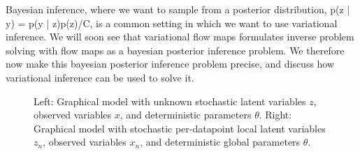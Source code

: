 \documentclass[12pt,a4paper]{report}
\begin{document}
Bayesian inference, where we want to sample from a posterior distribution, p(z | y) = p(y | z)p(z)/C, is a common setting in which we want to use variational inference. 
We will soon see that variational flow maps formulates inverse problem solving with flow maps as a bayesian posterior inference problem. 
We therefore now make this bayesian posterior inference problem precise, and discuss how variational inference can be used to solve it. 

\begin{figure}
    \centering
    \caption{Left: Graphical model with unknown stochastic latent variables $z$, observed variables $x$, and deterministic parameters $\theta$. Right: Graphical model with stochastic per-datapoint local latent variables $z_n$, observed variables $x_n$, and deterministic global parameters $\theta$. }
    \label{fig:graphical_model_VI}
\end{figure}
\end{document}

